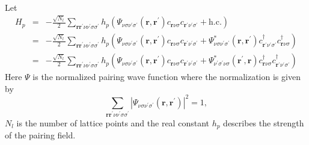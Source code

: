 Let
\begin{eqnarray}
H_{p} & = & - \frac{\sqrt{N_l}}{2} 
\sum_{\mathbf{r}\mathbf{r}^{\prime}\nu\nu^{\prime}\sigma\sigma^{\prime}} 
h_p \left( \Psi_{\nu\sigma\nu^{\prime}\sigma^{\prime}}(\mathbf{r},\mathbf{r}^{\prime})
c_{\mathbf{r}\nu\sigma}
c_{\mathbf{r}^{\prime}\nu^{\prime}\sigma^{\prime}} + \mathrm{h.c.}\right) \\
 &  = & - \frac{\sqrt{N_l}}{2} \sum_{\mathbf{r}\mathbf{r}^{\prime}\nu\nu^{\prime}\sigma\sigma^{\prime}} 
h_p \left(\Psi_{\nu\sigma\nu^{\prime}\sigma^{\prime}}(\mathbf{r},\mathbf{r}^{\prime})  
c_{\mathbf{r}\nu\sigma}
c_{\mathbf{r}^{\prime}\nu^{\prime}\sigma^{\prime}} + 
\Psi_{\nu\sigma\nu^{\prime}\sigma^{\prime}}^*(\mathbf{r},\mathbf{r}^{\prime}) 
c^{\dagger}_{\mathbf{r}^{\prime}\nu^{\prime}\sigma^{\prime}}
 c^{\dagger}_{\mathbf{r}\nu\sigma}\right) \\
& = &  - \frac{\sqrt{N_l}}{2} 
\sum_{\mathbf{r}\mathbf{r}^{\prime}\nu\nu^{\prime}\sigma\sigma^{\prime}} 
h_p \left(\Psi_{\nu\sigma\nu^{\prime}\sigma^{\prime}}(\mathbf{r},\mathbf{r}^{\prime})  
c_{\mathbf{r}\nu\sigma}
c_{\mathbf{r}^{\prime}\nu^{\prime}\sigma^{\prime}} + 
\Psi_{\nu^{\prime}\sigma^{\prime}\nu\sigma}^*(\mathbf{r}^{\prime},\mathbf{r}) 
 c^{\dagger}_{\mathbf{r}\nu\sigma}c^{\dagger}_{\mathbf{r}^{\prime}\nu^{\prime}\sigma^{\prime}}
  \right)
\end{eqnarray}
Here $\Psi$ is the normalized pairing wave function
where the normalization is given by
\begin{equation}
\sum_{\mathbf{r}\mathbf{r}^{\prime}\nu\nu^{\prime}\sigma\sigma^{\prime}} | 
\Psi_{\nu\sigma\nu^{\prime}\sigma^{\prime}}(\mathbf{r},\mathbf{r}^{\prime}) |^2 = 1,
\end{equation}
$N_l$ is the number of lattice points
and the real constant $h_p$ describes the strength of the
pairing field.

